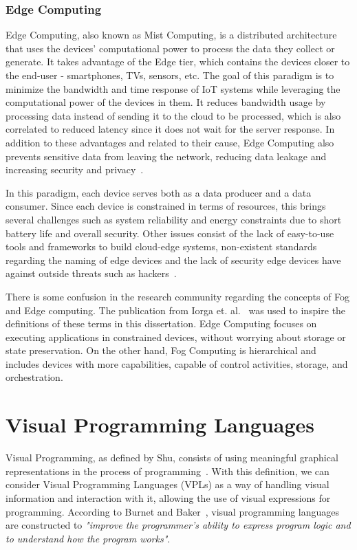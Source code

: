 \subsubsection{Edge Computing}\label{sec:edge_computing}

Edge Computing, also known as Mist Computing, is a distributed architecture that uses the devices' computational power to process the data they collect or generate. It takes advantage of the Edge tier, which contains the devices closer to the end-user - smartphones, TVs, sensors, etc. The goal of this paradigm is to minimize the bandwidth and time response of IoT systems while leveraging the computational power of the devices in them. It reduces bandwidth usage by processing data instead of sending it to the cloud to be processed, which is also correlated to reduced latency since it does not wait for the server response. In addition to these advantages and related to their cause, Edge Computing also prevents sensitive data from leaving the network, reducing data leakage and increasing security and privacy~\cite{edge_computing, edge_computing_2019}.

In this paradigm, each device serves both as a data producer and a data consumer. Since each device is constrained in terms of resources, this brings several challenges such as system reliability and energy constraints due to short battery life and overall security. Other issues consist of the lack of easy-to-use tools and frameworks to build cloud-edge systems, non-existent standards regarding the naming of edge devices and the lack of security edge devices have against outside threats such as hackers~\cite{promise_of_edge_computing}.

There is some confusion in the research community regarding the concepts of Fog and Edge computing. The publication from Iorga et. al.~\cite{fog_edge_differences} was used to inspire the definitions of these terms in this dissertation. Edge Computing focuses on executing applications in constrained devices, without worrying about storage or state preservation. On the other hand, Fog Computing is hierarchical and includes devices with more capabilities, capable of control activities, storage, and orchestration.

\section{Visual Programming Languages}\label{sec:background_vpl}

Visual Programming, as defined by Shu, consists of using meaningful graphical representations in the process of programming~\cite{vpl_definition_shu}. With this definition, we can consider Visual Programming Languages (VPLs) as a way of handling visual information and interaction with it, allowing the use of visual expressions for programming. According to Burnet and Baker~\cite{scaling_vpls}, visual programming languages are constructed to \emph{"improve the programmer's ability to express program logic and to understand how the program works"}.

